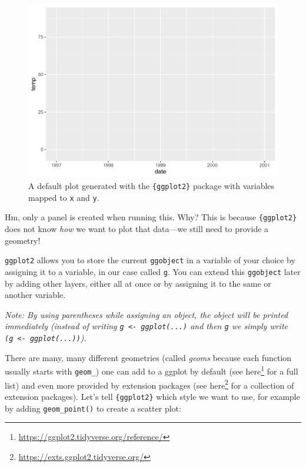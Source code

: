 \documentclass[
]{krantz}
\renewcommand{\href}[2]{#2\footnote{\url{#1}}}
\begin{document}
\begin{figure}
\centering
\includegraphics{bookdown_files/figure-latex/ggplot-1.pdf}
\caption{\label{fig:ggplot}A default plot generated with the \texttt{\{ggplot2\}} package with variables mapped to \texttt{x} and \texttt{y}.}
\end{figure}

Hm, only a panel is created when running this. Why? This is because \texttt{\{ggplot2\}} does not know \emph{how} we want to plot that data---we still need to provide a geometry!

\texttt{ggplot2} allows you to store the current \texttt{ggobject} in a variable of your choice by assigning it to a variable, in our case called \texttt{g}. You can extend this \texttt{ggobject} later by adding other layers, either all at once or by assigning it to the same or another variable.

\emph{Note: By using parentheses while assigning an object, the object will be printed immediately (instead of writing \texttt{g\ \textless{}-\ ggplot(...)} and then \texttt{g} we simply write \texttt{(g\ \textless{}-\ ggplot(...))}).}

There are many, many different geometries (called \emph{geoms} because each function usually starts with \texttt{geom\_}) one can add to a ggplot by default (see \href{https://ggplot2.tidyverse.org/reference/}{here} for a full list) and even more provided by extension packages (see \href{https://exts.ggplot2.tidyverse.org/}{here} for a collection of extension packages). Let's tell \texttt{\{ggplot2\}} which style we want to use, for example by adding \texttt{geom\_point()} to create a scatter plot:
\end{document}
